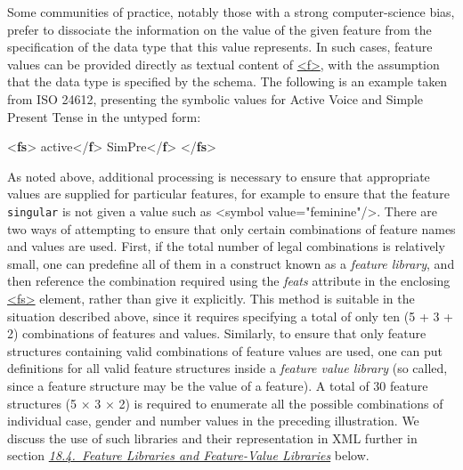 Some communities of practice, notably those with a strong computer-science bias, prefer to dissociate the information on the value of the given feature from the specification of the data type that this value represents. In such cases, feature values can be provided directly as textual content of \hyperref[TEI.f]{<f>}, with the assumption that the data type is specified by the schema. The following is an example taken from ISO 24612, presenting the symbolic values for Active Voice and Simple Present Tense in the untyped form:\par\bgroup{}\exampleFont \begin{shaded}\noindent\mbox{}{<\textbf{fs}>}\mbox{}\newline 
{}active{</\textbf{f}>}\mbox{}\newline 
{}SimPre{</\textbf{f}>}\mbox{}\newline 
{</\textbf{fs}>}\end{shaded}\egroup\par \par
As noted above, additional processing is necessary to ensure that appropriate values are supplied for particular features, for example to ensure that the feature \texttt{singular} is not given a value such as <symbol value="feminine"/>. There are two ways of attempting to ensure that only certain combinations of feature names and values are used. First, if the total number of legal combinations is relatively small, one can predefine all of them in a construct known as a \textit{feature library}, and then reference the combination required using the {\itshape feats} attribute in the enclosing \hyperref[TEI.fs]{<fs>} element, rather than give it explicitly. This method is suitable in the situation described above, since it requires specifying a total of only ten (5 + 3 + 2) combinations of features and values. Similarly, to ensure that only feature structures containing valid combinations of feature values are used, one can put definitions for all valid feature structures inside a \textit{feature value library} (so called, since a feature structure may be the value of a feature). A total of 30 feature structures (5 × 3 × 2) is required to enumerate all the possible combinations of individual case, gender and number values in the preceding illustration. We discuss the use of such libraries and their representation in XML further in section \textit{\hyperref[FSFL]{18.4.\ Feature Libraries and Feature-Value Libraries}} below.\par
